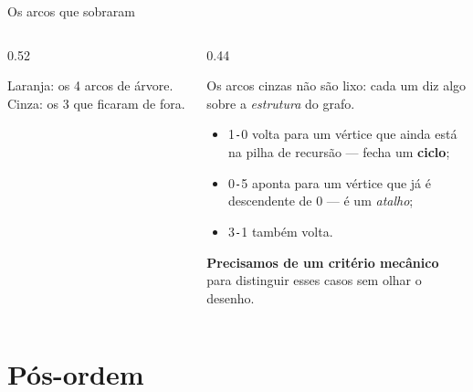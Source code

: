 \documentclass[aspectratio=169]{beamer}
\begin{document}
\begin{frame}{Os arcos que sobraram}
  \begin{columns}[T]
    \begin{column}{0.52\textwidth}
      \begin{center}
      \end{center}
      {\scriptsize Laranja: os 4 arcos de árvore. Cinza: os 3 que ficaram de fora.}
    \end{column}
    \begin{column}{0.44\textwidth}
      {\small
      Os arcos cinzas não são lixo: cada um diz algo sobre a \emph{estrutura} do grafo.

      \medskip
      \begin{itemize}\scriptsize
        \item 1\texttt{-}0 volta para um vértice que ainda está na pilha de
              recursão --- fecha um \textbf{ciclo};
        \item 0\texttt{-}5 aponta para um vértice que já é descendente de 0 ---
              é um \emph{atalho};
        \item 3\texttt{-}1 também volta.
      \end{itemize}
      \textbf{Precisamos de um critério mecânico} para distinguir esses casos
      sem olhar o desenho.}
    \end{column}
  \end{columns}
\end{frame}

\section{Pós-ordem}
\end{document}
